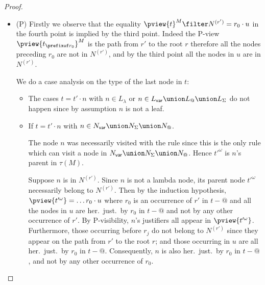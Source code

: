 \begin{proof}
\begin{itemize}
{\begin{itemize}
  \end{itemize}

  ...}

\item (P) Firstly we observe that the equality $\pview{t}^M \filter N^{(r')} = r_0\cdot u$
in the fourth point is implied by the third point. Indeed the
P-view $\pview{t_{\prefixof r_0}}^M$ is the path from $r'$ to the root $r$ therefore all the
nodes preceding $r_0$ are not in $N^{(r')}$, and by the third point all the nodes in $u$ are in $N^{(r')}$.

    We do a case analysis on the type of the last node in $t$:
    \begin{itemize}

    \item The cases $t = t' \cdot n$ with $n\in L_\lambda$ or $n \in L_{\sf var} \union L_@ \union
    L_\Sigma$ do not happen since by assumption $n$ is not a
    leaf.

    \item If $t = t' \cdot n$ with $n \in N_{\sf var} \union
    N_\Sigma \union N_@$.

    The node $n$ was necessarily visited with the rule  since this is the only rule
    which can visit a node in $N_{\sf var} \union N_\Sigma \union N_@$. Hence $t'^\omega$ is $n$'s parent in $\tau(M)$.

    Suppose $n$ is in $N^{(r')}$. Since $n$ is not a lambda node, its parent node $t'^\omega$ necessarily belong to $N^{(r')}$.
    Then by the induction hypothesis, $\pview{t'^\omega} = \ldots r_0 \cdot u$ where
    $r_0$ is an occurrence of $r'$ in $t-@$ and all the nodes in $u$ are her.\ just.\ by
    $r_0$ in $t-@$ and not by any other occurrence of $r'$.
    By P-visibility, $n$'s justifiers all appear in $\pview{t'^\omega}$. Furthermore, those occurring before $r_j$
    do not belong to $N^{(r')}$ since they appear on the path from $r'$ to the root $r$; and those occurring in $u$
    are all her.\ just.\ by $r_0$ in $t-@$. Consequently, $n$ is also her.\ just.\ by $r_0$ in $t-@$,
    and not by any other occurrence of $r_0$.


\end{itemize}
\end{itemize}
\end{proof}
